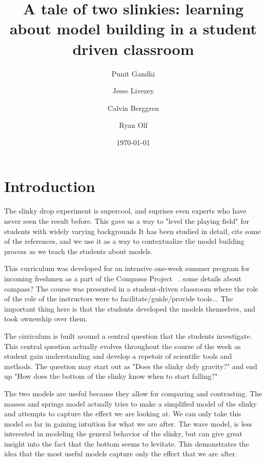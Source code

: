 \documentclass[aps,pre,10pt,superscriptaddress,showpacs,amsmath,amssymb,nofootinbib]{revtex4-1}
\begin{document}
\title{A tale of two slinkies: learning about model building in a student driven classroom }
\author{Punit  Gandhi}
\author{Jesse Livezey}
\author{Calvin Berggren}
\author{Ryan Olf}
\date{\today}

\begin{abstract}

\end{abstract}

\maketitle

\section{Introduction}
The slinky drop experiment is supercool, and suprises even experts who have never seen the result before.  This gave us a way to "level the playing field" for students with widely varying backgrounds    It has been studied in detail, cite some of the references, and we use it as a way to contextualize the model building process as we teach the students about models. 

This curriculum was developed for an intensive one-week summer program for incoming freshmen as a part of the Compasss Project ~\cite{albana2013}. some details about compass?  The course was presented in a student-driven classroom where the role of the role of the instructors were to facilitate/guide/provide tools...  The important thing here is that the students developed the models themselves, and took ownership over them.  

The cirriculum is built around a central question that the students investigate.  This central question actually evolves throughout the course of the week as student gain understanding and develop a repetoir of scientific tools and methods.  The question may start out as "Does the slinky defy gravity?" and end up  "How does the bottom of the slinky know when to start falling?" 

The two models are useful because they allow for comparing and contrasting. The masses and springs model actually tries to make a simplified model of the slinky and attempts to capture the effect we are looking at.  We can only take this model so far in gaining intuition for what we are after.    The wave model, is less interested in modeling the general behavior of the slinky, but can give great insight into the fact that the bottom seems to levitate.  This demonstrates the idea that the most useful  models  capture only the effect that we are after. 
\end{document}
